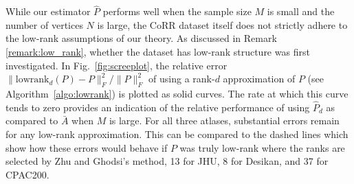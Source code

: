 \documentclass[journal,twoside,web]{ieeecolor}
\begin{document}
While our estimator $\hat{P}$ performs well when the sample size $M$ is small and the number of vertices $N$ is large, the CoRR dataset itself does not strictly adhere to the low-rank assumptions of our theory.
As discussed in Remark \ref{remark:low_rank}, whether the dataset has low-rank structure was first investigated. In Fig.~\ref{fig:screeplot}, the relative error $\|\mathrm{lowrank}_d(P)-P\|_F^2/\|P\|_F^2$ of using a rank-$d$ approximation of $P$ (see Algorithm~\ref{algo:lowrank}) is plotted as solid curves.
The rate at which this curve tends to zero provides an indication of the relative performance of using $\hat{P}_d$ as compared to $\bar{A}$ when $M$ is large.
For all three atlases, substantial errors remain for any low-rank approximation.
This can be compared to the dashed lines which show how these errors would behave if $P$ was truly low-rank where the ranks are selected by Zhu and Ghodsi's method, 13 for JHU, 8 for Desikan, and 37 for CPAC200.

\end{document}
